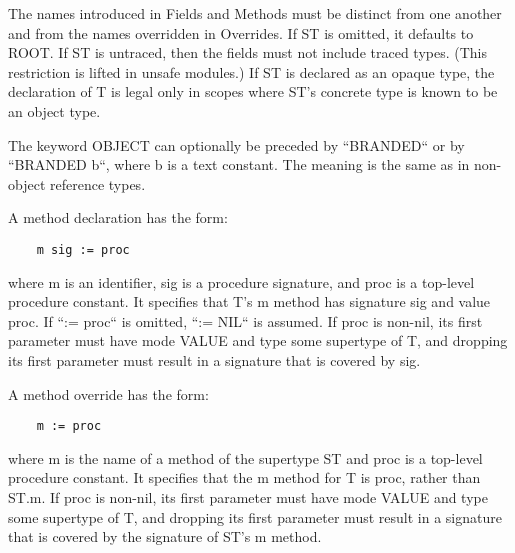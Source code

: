 \documentclass[10pt]{article}
\begin{document}
  The names introduced in Fields and Methods must be distinct from one another and from the names overridden in Overrides. If ST is omitted, it defaults to ROOT. If ST is untraced, then the fields must not include traced types. (This restriction is lifted in unsafe modules.) If ST is declared as an opaque type, the declaration of T is legal only in scopes where ST's concrete type is known to be an object type. 


 The keyword OBJECT can optionally be preceded by ``BRANDED`` or by ``BRANDED b``, where b is a text constant. The meaning is the same as in non-object reference types. 


 A method declaration has the form: 
\begin{verbatim}
    m sig := proc
\end{verbatim}
 where m is an identifier, sig is a procedure signature, and proc is a top-level procedure constant. It specifies that T's m method has signature sig and value proc. If ``:= proc`` is omitted, ``:= NIL`` is assumed. If proc is non-nil, its first parameter must have mode VALUE and type some supertype of T, and dropping its first parameter must result in a signature that is covered by sig. 


 A method override has the form: 
\begin{verbatim}
    m := proc
\end{verbatim}
 where m is the name of a method of the supertype ST and proc is a top-level procedure constant. It specifies that the m method for T is proc, rather than ST.m. If proc is non-nil, its first parameter must have mode VALUE and type some supertype of T, and dropping its first parameter must result in a signature that is covered by the signature of ST's m method. 
\end{document}
